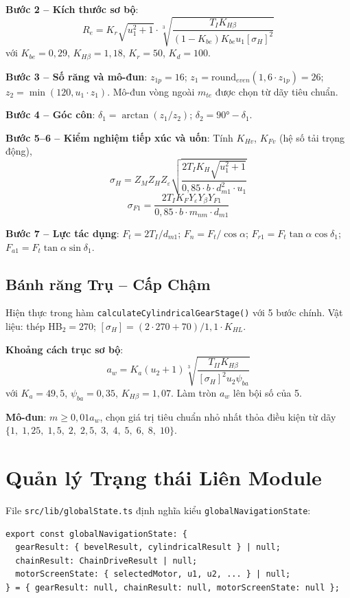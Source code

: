 \textbf{Bước 2 -- Kích thước sơ bộ}:
\[
  R_e = K_r \sqrt{u_1^2+1} \cdot
        \sqrt[3]{\frac{T_I K_{H\beta}}{(1-K_{be}) K_{be} u_1 [\sigma_H]^2}}
\]
với $K_{be} = 0{,}29$, $K_{H\beta} = 1{,}18$, $K_r = 50$, $K_d = 100$.

\textbf{Bước 3 -- Số răng và mô-đun}:
$z_{1p} = 16$; $z_1 = \text{round}_{even}(1{,}6 \cdot z_{1p}) = 26$;
$z_2 = \min(120, u_1 \cdot z_1)$.
Mô-đun vòng ngoài $m_{te}$ được chọn từ dãy tiêu chuẩn.

\textbf{Bước 4 -- Góc côn}: $\delta_1 = \arctan(z_1/z_2)$; $\delta_2 = 90° - \delta_1$.

\textbf{Bước 5--6 -- Kiểm nghiệm tiếp xúc và uốn}:
Tính $K_{Hv}$, $K_{Fv}$ (hệ số tải trọng động),
\[
  \sigma_H = Z_M Z_H Z_\varepsilon
             \sqrt{\frac{2 T_I K_H \sqrt{u_1^2+1}}{0{,}85 \cdot b \cdot d_{m1}^2 \cdot u_1}}
\]
\[
  \sigma_{F1} = \frac{2 T_I K_F Y_\varepsilon Y_\beta Y_{F1}}{0{,}85 \cdot b \cdot m_{nm} \cdot d_{m1}}
\]

\textbf{Bước 7 -- Lực tác dụng}:
$F_t = 2T_I/d_{m1}$; $F_n = F_t/\cos\alpha$;
$F_{r1} = F_t \tan\alpha \cos\delta_1$; $F_{a1} = F_t \tan\alpha \sin\delta_1$.

\subsection{Bánh răng Trụ -- Cấp Chậm}

Hiện thực trong hàm \texttt{calculateCylindricalGearStage()} với 5 bước chính.
Vật liệu: thép HB$_2 = 270$; $[\sigma_H] = (2\cdot270+70)/1{,}1 \cdot K_{HL}$.

\textbf{Khoảng cách trục sơ bộ}:
\[
  a_w = K_a (u_2+1) \sqrt[3]{\frac{T_{II} K_{H\beta}}{[\sigma_H]^2 u_2 \psi_{ba}}}
\]
với $K_a = 49{,}5$, $\psi_{ba} = 0{,}35$, $K_{H\beta} = 1{,}07$.
Làm tròn $a_w$ lên bội số của 5.

\textbf{Mô-đun}: $m \geq 0{,}01 a_w$, chọn giá trị tiêu chuẩn nhỏ nhất thỏa điều kiện
từ dãy $\{1,\; 1{,}25,\; 1{,}5,\; 2,\; 2{,}5,\; 3,\; 4,\; 5,\; 6,\; 8,\; 10\}$.

\section{Quản lý Trạng thái Liên Module}
\label{sec:impl-state}

File \texttt{src/lib/globalState.ts} định nghĩa kiểu \texttt{globalNavigationState}:

\begin{verbatim}
export const globalNavigationState: {
  gearResult: { bevelResult, cylindricalResult } | null;
  chainResult: ChainDriveResult | null;
  motorScreenState: { selectedMotor, u1, u2, ... } | null;
} = { gearResult: null, chainResult: null, motorScreenState: null };
\end{verbatim}

